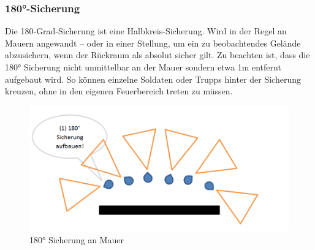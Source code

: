 \subsubsection{180°-Sicherung}
	Die 180-Grad-Sicherung ist eine Halbkreis-Sicherung. Wird in der Regel an Mauern angewandt – oder in einer Stellung, um ein zu beobachtendes Gelände abzusichern, wenn der Rückraum als absolut sicher gilt. Zu beachten ist, dass die 180° Sicherung nicht unmittelbar an der Mauer sondern etwa 1m entfernt aufgebaut wird. So können einzelne Soldaten oder Trupps hinter der Sicherung kreuzen, ohne in den eigenen Feuerbereich treten zu müssen. \\
		\begin{figure}[htbp]
			\centering
			\includegraphics[width=15cm]{./Grafiken/Abschnitt/180er.png}
			\caption{180° Sicherung an Mauer}
		\end{figure}